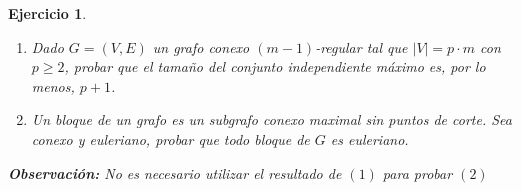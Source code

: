 \documentclass[a4paper,oneside,12pt]{amsart}
\newtheorem{quest}{Ejercicio}
\begin{document}
\begin{quest} \hfill
\begin{enumerate} 
    \item Dado $G=(V,E)$ un grafo conexo $(m-1)$-regular tal que $|V|=p\cdot m$ con $p\geq 2$, probar que el tamaño del conjunto independiente máximo es, por lo menos, $p+1$.
    \item Un bloque de un grafo es un subgrafo conexo maximal sin puntos de corte. Sea  conexo y euleriano, probar que todo bloque de $G$ es euleriano.
    
            
\end{enumerate}
\textbf{Observación:} No es necesario utilizar el resultado de $(1)$ para probar $(2)$
\end{quest}
\end{document}

